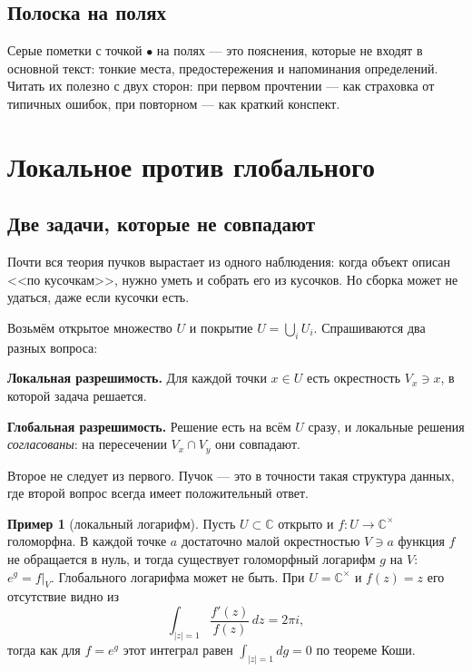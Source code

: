 \documentclass[11pt,b5paper]{article}
\newcommand{\C}{\mathbb{C}}
\theoremstyle{plain}
\theoremstyle{definition}
\newtheorem{exminner}[thminner]{Пример}
\theoremstyle{remark}
\newcommand{\thmbeg}{%
  \par\smallskip
  \begin{lrbox}{\thmbox}%
  \begin{minipage}{\linewidth}}
\newcommand{\thmend}{%
  \end{minipage}%
  \end{lrbox}%
  \noindent\usebox{\thmbox}%
  \par\smallskip}
\newenvironment{exm}{\thmbeg\begin{exminner}}{\end{exminner}\thmend}
\theoremstyle{definition}
\renewcommand{\thmbeg}{\par\smallskip}
\renewcommand{\thmend}{\par\smallskip}
\let\brutsection\section
\renewcommand{\section}{\Needspace{7\baselineskip}\brutsection}
\let\brutsubsection\subsection
\renewcommand{\subsection}{\Needspace{5\baselineskip}\brutsubsection}
\begin{document}
\subsection{Полоска на полях}
Серые пометки с точкой $\bullet$ на полях --- это пояснения, которые
не входят в основной текст: тонкие места, предостережения и
напоминания определений. Читать их полезно с двух сторон: при первом
прочтении --- как страховка от типичных ошибок, при повторном --- как
краткий конспект.

\section{Локальное против глобального}

\subsection{Две задачи, которые не совпадают}
Почти вся теория пучков вырастает из одного наблюдения: когда объект
описан <<по кусочкам>>, нужно уметь и собрать его из кусочков. Но
сборка может не удаться, даже если кусочки есть.

Возьмём открытое множество $U$ и покрытие $U=\bigcup_iU_i$.
Спрашиваются два разных вопроса:
\begin{conditions}
\item \textbf{Локальная разрешимость.} Для каждой точки $x\in U$
  есть окрестность $V_x\ni x$, в которой задача решается.
\item \textbf{Глобальная разрешимость.} Решение есть на всём $U$ сразу,
  и локальные решения \emph{согласованы}: на пересечении $V_x\cap V_y$
  они совпадают.
\end{conditions}
Второе не следует из первого. Пучок --- это в точности такая структура
данных, где второй вопрос всегда имеет положительный ответ.

\begin{exm}[локальный логарифм]\label{exm:log}
Пусть $U\subset\C$ открыто и $f:U\to\C^\times$ голоморфна. В каждой
точке $a$ достаточно малой окрестностью $V\ni a$ функция $f$ не
обращается в нуль, и тогда существует голоморфный логарифм $g$ на $V$:
$e^g=f|_V$. Глобального логарифма может не быть. При $U=\C^\times$ и
$f(z)=z$ его отсутствие видно из
\[
  \int_{|z|=1}\frac{f'(z)}{f(z)}\,dz=2\pi i,
\]
тогда как для $f=e^g$ этот интеграл равен $\int_{|z|=1}dg=0$ по
теореме Коши.
\end{exm}
\end{document}
